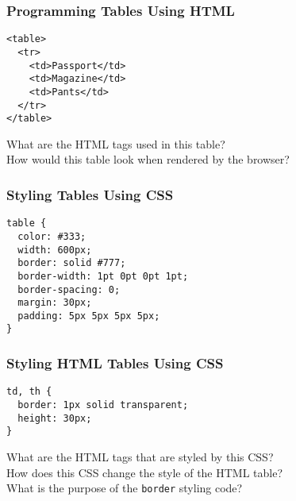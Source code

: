 \documentclass[14pt,aspectratio=169]{beamer}
\begin{document}
%
\begin{frame}[fragile]
  \frametitle{Programming Tables Using HTML}
  \normalsize
  \hspace*{.25in}
  \begin{minipage}{6in}
    \vspace*{.2in}
    \begin{verbatim}
<table>
  <tr>
    <td>Passport</td>
    <td>Magazine</td>
    <td>Pants</td>
  </tr>
</table>
    \end{verbatim}
  \end{minipage}
  \vspace*{.05in}
  \begin{center}
    \noindent What are the HTML tags used in this table?\\
    \noindent How would this table look when rendered by the browser?\\
  \end{center}
\end{frame}

%
\begin{frame}[fragile]
  \frametitle{Styling Tables Using CSS}
  \normalsize
  \hspace*{.25in}
  \begin{minipage}{6in}
    \vspace*{.1in}
    \begin{verbatim}
table {
  color: #333;
  width: 600px;
  border: solid #777;
  border-width: 1pt 0pt 0pt 1pt;
  border-spacing: 0;
  margin: 30px;
  padding: 5px 5px 5px 5px;
}
    \end{verbatim}
  \end{minipage}
\end{frame}

%
\begin{frame}[fragile]
  \frametitle{Styling HTML Tables Using CSS}
  \normalsize
  \hspace*{.25in}
  \begin{minipage}{6in}
    \vspace*{.2in}
    \begin{verbatim}
td, th {
  border: 1px solid transparent;
  height: 30px;
}
    \end{verbatim}
  \end{minipage}
  \vspace*{.05in}
  \begin{center}
    \noindent What are the HTML tags that are styled by this CSS?\\
    \noindent How does this CSS change the style of the HTML table?\\
    \noindent What is the purpose of the {\tt border} styling code?\\
  \end{center}
\end{frame}
\end{document}
